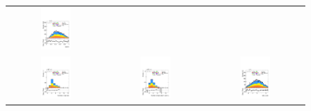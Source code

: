 \begin{figure}[htbp]
\begin{tabular}{@{}c c c@{}}
    \includegraphics[width=0.33\textwidth]{images/plots_modelling_run2_run3_variables/run_3_tth/plot_ratio13_hh_tth_22_23_24.pdf} \\[4pt]
    \includegraphics[width=0.33\textwidth]{images/plots_modelling_run2_run3_variables/run_3_tth/plot_n_ljets_hh_tth_22_23_24.pdf} &
    \includegraphics[width=0.33\textwidth]{images/plots_modelling_run2_run3_variables/run_3_tth/plot_n_ljets_maxSameEta_hh_tth_22_23_24.pdf} &
    \includegraphics[width=0.33\textwidth]{images/plots_modelling_run2_run3_variables/run_3_tth/plot_bjet_0_eta_hh_tth_22_23_24.pdf}
  \end{tabular}


\end{figure}
